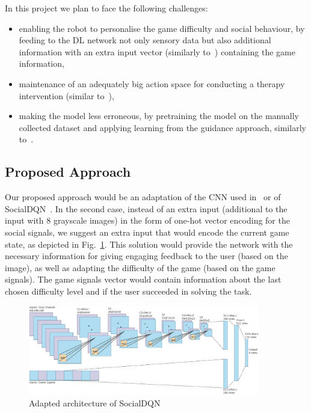 \documentclass[thesis]{mas_proposal}
\begin{document}
In this project we plan to face the following challenges:
\begin{itemize}
	\item enabling the robot to personalise the game difficulty and social behaviour, by feeding to the DL network not only sensory data but also additional information with an extra input vector (similarly to~\cite{Qureshi2018,Belo2022,Hijaz2021}) containing the game information,
	\item maintenance of an adequately big action space for conducting a therapy intervention (similar to~\cite{stolarz2022learningbased,stolarz2022personalisedrobot,tsiakas2018task}),
	\item making the model less erroneous, by pretraining the model on the manually collected dataset and applying learning from the guidance approach, similarly to~\cite{senft2017supervised}.
\end{itemize}

\subsection{Proposed Approach}
\label{subsec:proposed_approach}

Our proposed approach would be an adaptation of the CNN used in~\cite{Romeo2018,Romeo2019} or of SocialDQN~\cite{Belo2022}. In the second case, instead of an extra input (additional to the input with 8 grayscale images) in the form of one-hot vector encoding for the social signals, we suggest an extra input that would encode the current game state, as depicted in Fig.~\ref{fig:proposed_architecture}. This solution would provide the network with the necessary information for giving engaging feedback to the user (based on the image), as well as adapting the difficulty of the game (based on the game signals). The game signals vector would contain information about the last chosen difficulty level and if the user succeeded in solving the task.

\begin{figure}[htb!]
	\centering
	\includegraphics[width=0.9\textwidth]{images/architecture/proposed_architecture.png}
	\caption{Adapted architecture of SocialDQN~\cite{Belo2022}}
	\label{fig:proposed_architecture}
\end{figure}
\end{document}
